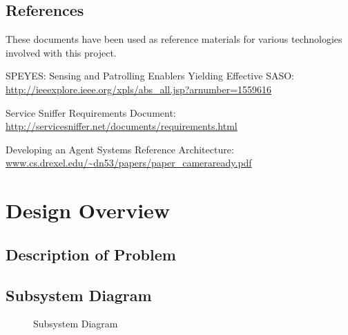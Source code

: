 \documentclass[titlepage]{article}
\renewenvironment{itemize*}%
    {\begin{itemize}%
        \setlength{\itemsep}{0pt}%
        \setlength{\parskip}{0pt}%
        \setlength{\partopsep}{0pt}%
        \setlength{\topsep}{0pt}}%
    {\end{itemize}}
\begin{document}
\subsection{References%
  \label{references}%
}

These documents have been used as reference materials for various technologies involved with this project.
%
\begin{itemize*}
	\item SPEYES: Sensing and Patrolling Enablers Yielding Effective SASO: \url{http://ieeexplore.ieee.org/xpls/abs_all.jsp?arnumber=1559616}
	\item Service Sniffer Requirements Document: \url{http://servicesniffer.net/documents/requirements.html}
    \item Developing an Agent Systems Reference Architecture: \url{www.cs.drexel.edu/~dn53/papers/paper_cameraready.pdf}
\end{itemize*}

\section{Design Overview}
\subsection{Description of Problem}
\subsection{Subsystem Diagram}
\begin{figure}%
    \centering
    \caption{Subsystem Diagram}
    \label{fig-subsystem}
\end{figure}
\end{document}
